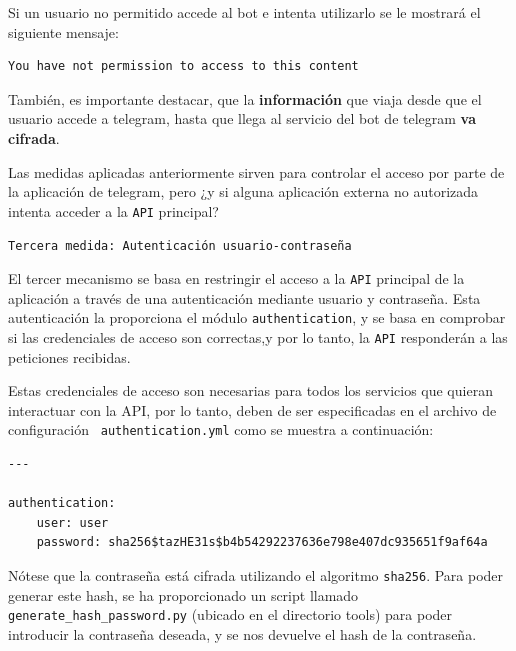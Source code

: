 \vspace{-0.5cm}


Si un usuario no permitido accede al bot e intenta utilizarlo se le mostrará el siguiente mensaje:

\vspace{-0.5cm}

\begin{verbatim}
You have not permission to access to this content
\end{verbatim}

\vspace{-0.5cm}

También, es importante destacar, que la \textbf{información} que viaja desde que el usuario accede a telegram, hasta que llega al servicio del bot de telegram \textbf{va cifrada}.

Las medidas aplicadas anteriormente sirven para controlar el acceso por parte de la aplicación de telegram, pero ¿y si alguna aplicación externa no autorizada intenta acceder a la \texttt{API} principal?

\texttt{Tercera medida: Autenticación usuario-contraseña}

El tercer mecanismo se basa en restringir el acceso a la \texttt{API} principal de la aplicación a través de una autenticación mediante usuario y contraseña. Esta autenticación la proporciona el módulo \texttt{authentication}, y se basa en comprobar si las credenciales de acceso son correctas,y por lo tanto, la \texttt{API} responderán a las peticiones recibidas.

Estas credenciales de acceso son necesarias para todos los servicios que quieran interactuar con la API, por lo tanto, deben de ser especificadas en el archivo de configuración \texttt{ 	authentication.yml} como se muestra a continuación:

\vspace{-0.5cm}

\begin{verbatim}
---

authentication:
    user: user
    password: sha256$tazHE31s$b4b54292237636e798e407dc935651f9af64a

\end{verbatim}

\vspace{-1cm}

Nótese que la contraseña está cifrada utilizando el algoritmo \texttt{sha256}. Para poder generar este hash, se ha proporcionado un script llamado \texttt{generate\_hash\_password.py} (ubicado en el directorio tools) para poder introducir la contraseña deseada, y se nos devuelve el hash de la contraseña.

